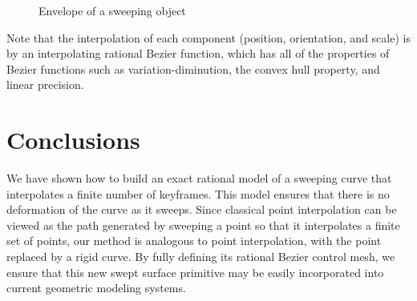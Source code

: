 \begin{figure}
\vspace{2.75in}
\caption{Envelope of a sweeping object}
\label{fig:robot}
\end{figure}


Note that the interpolation of each component (position, orientation,
and scale) is by an interpolating 
rational Bezier function, which has all of the properties of Bezier
functions such as variation-diminution, the convex hull property,
and linear precision.

\section{Conclusions}

We have shown how to build an exact rational model of a sweeping curve
that interpolates a finite number of keyframes.
This model ensures that there is no deformation of the curve as it sweeps.
Since classical point interpolation can be viewed as the path generated
by sweeping a point so that it interpolates a finite set of points,
our method is analogous to point interpolation, with the point replaced
by a rigid curve.
By fully defining its rational Bezier control mesh, we ensure that
this new swept surface primitive may be easily incorporated into
current geometric modeling systems.




